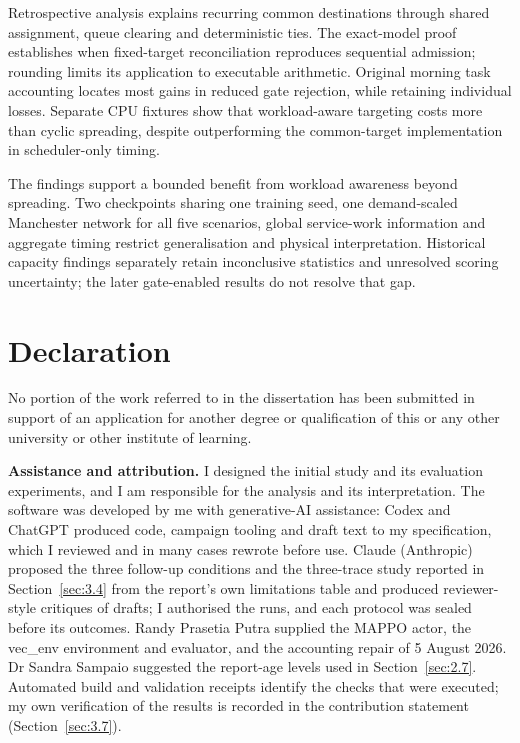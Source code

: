 \documentclass[12pt,a4paper]{article}
\begin{document}
Retrospective analysis explains recurring common destinations through shared assignment, queue clearing and deterministic ties. The exact-model proof establishes when fixed-target reconciliation reproduces sequential admission; rounding limits its application to executable arithmetic. Original morning task accounting locates most gains in reduced gate rejection, while retaining individual losses. Separate CPU fixtures show that workload-aware targeting costs more than cyclic spreading, despite outperforming the common-target implementation in scheduler-only timing.

The findings support a bounded benefit from workload awareness beyond spreading. Two checkpoints sharing one training seed, one demand-scaled Manchester network for all five scenarios, global service-work information and aggregate timing restrict generalisation and physical interpretation. Historical capacity findings separately retain inconclusive statistics and unresolved scoring uncertainty; the later gate-enabled results do not resolve that gap.


\clearpage
\section*{Declaration}
No portion of the work referred to in the dissertation has been submitted in support of an application for another degree or qualification of this or any other university or other institute of learning.

\textbf{Assistance and attribution.} I designed the initial study and its evaluation experiments, and I am responsible for the analysis and its interpretation. The software was developed by me with generative-AI assistance: Codex and ChatGPT produced code, campaign tooling and draft text to my specification, which I reviewed and in many cases rewrote before use. Claude (Anthropic) proposed the three follow-up conditions and the three-trace study reported in Section~\ref{sec:3.4} from the report's own limitations table and produced reviewer-style critiques of drafts; I authorised the runs, and each protocol was sealed before its outcomes. Randy Prasetia Putra supplied the MAPPO actor, the vec\_env environment and evaluator, and the accounting repair of 5 August 2026. Dr Sandra Sampaio suggested the report-age levels used in Section~\ref{sec:2.7}. Automated build and validation receipts identify the checks that were executed; my own verification of the results is recorded in the contribution statement (Section~\ref{sec:3.7}).
\end{document}
